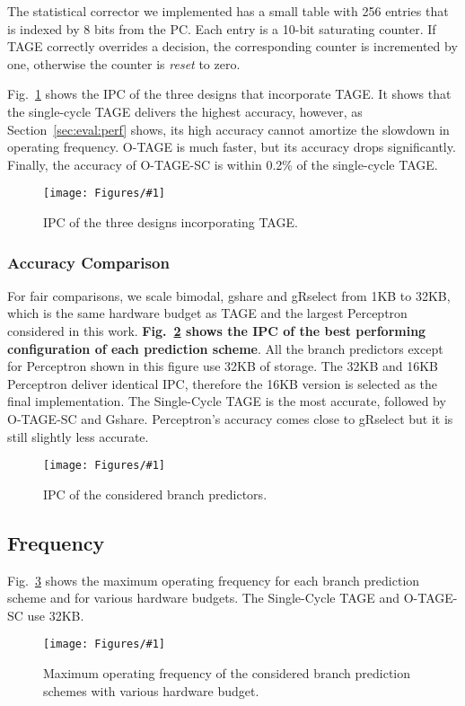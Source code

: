 \documentclass[conference]{IEEEtran}
\newcommand{\kfig}[4]{ %
        \begin{figure}[!t]
        \centering
        \texttt{[image: Figures/\#1]}
        \vspace{-1mm}
        \caption{#3}
        \label{#2}
        \end{figure}
}
\begin{document}
The statistical corrector we implemented has a small table with 256 entries that is indexed by 8 bits from the PC. Each entry is a 10-bit saturating counter. If TAGE correctly overrides a decision, the corresponding counter is incremented by one, otherwise the counter is \textit{reset} to zero.

Fig.~\ref{fig:tageIPC} shows the IPC of the three designs that incorporate TAGE. It shows that the single-cycle TAGE delivers the highest accuracy, however, as Section~\ref{sec:eval:perf} shows, its high accuracy cannot amortize the slowdown in operating frequency. \mbox{O-TAGE} is much faster, but its accuracy drops significantly. Finally, the accuracy of \mbox{O-TAGE-SC} is within 0.2\% of the single-cycle TAGE.
\kfig{tageIPC.pdf}{fig:tageIPC}{IPC of the three designs incorporating TAGE.}{angle = 0, trim = 1.1in 1.5in 0.9in 1.5in, clip, width=0.4\textwidth}


\subsubsection{Accuracy Comparison}
\label{sec:eval:ipc:comparison}
For fair comparisons, we scale bimodal, gshare and gRselect from 1KB to 32KB, which is the same hardware budget as TAGE and the largest Perceptron considered in this work. \textbf{Fig.~\ref{fig:adipc} shows the IPC of the best performing configuration of each prediction scheme}. All the branch predictors except for Perceptron shown in this figure use 32KB of storage. The 32KB and 16KB Perceptron deliver identical IPC, therefore the 16KB version is selected as the final implementation. The Single-Cycle TAGE is the most accurate, followed by \mbox{O-TAGE-SC} and Gshare. Perceptron's accuracy comes close to gRselect but it is still slightly less accurate.
\kfig{adipc.pdf}{fig:adipc}{IPC of the considered branch predictors.}{angle = 0, trim = 0.9in 1.9in 0.8in 1.8in, clip, width=0.5\textwidth}


\subsection{Frequency}
\label{sec:eval:fmax}
Fig.~\ref{fig:adfmax} shows the maximum operating frequency for each branch prediction scheme and for various hardware budgets. The Single-Cycle TAGE and \mbox{O-TAGE-SC} use 32KB.
\kfig{adfmax.pdf}{fig:adfmax}{Maximum operating frequency of the considered branch prediction schemes with various hardware budget.}{angle = 0, trim = 0.7in 4.5in 0.7in 5.1in, clip, width=0.5\textwidth}
\end{document}
